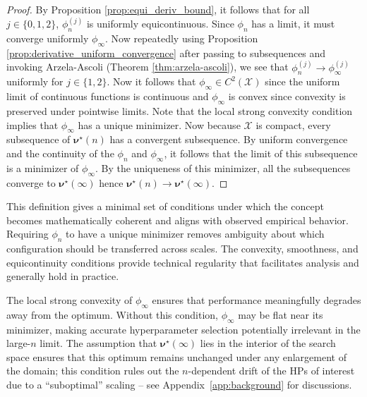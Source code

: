 \documentclass{article} %
\newcommand{\bhp}{\bm{\nu}}                       %
\newcommand{\searchspace}{\mathcal{X}}            %
\begin{document}
\begin{proof}
By Proposition \ref{prop:equi_deriv_bound}, it follows that for all $j \in \{0, 1, 2\}$, ${\phi_n^{(j)}}$ is uniformly equicontinuous. Since $\phi_n$ has a limit, it must converge uniformly $\phi_\infty$. Now repeatedly using Proposition \ref{prop:derivative_uniform_convergence} after passing to subsequences and invoking Arzela-Ascoli (Theorem \ref{thm:arzela-ascoli}), we see that $\phi_n^{(j)} \to \phi_\infty^{(j)}$ uniformly for $j \in \{1, 2\}$. Now it follows that $\phi_\infty \in C^2(\searchspace)$ since the uniform limit of continuous functions is continuous and $\phi_\infty$ is convex since convexity is preserved under pointwise limits. Note that the local strong convexity condition implies that $\phi_\infty$ has a unique minimizer. Now because $\searchspace$ is compact, every subsequence of $\bhp^\star(n)$ has a convergent subsequence. By uniform convergence and the continuity of the $\phi_n$ and $\phi_\infty$, it follows that the limit of this subsequence is a minimizer of $\phi_\infty$. By the uniqueness of this minimizer, all the subsequences converge to $\bhp^\star(\infty)$ hence $\bhp^\star(n) \to \bhp^\star(\infty)$.
\end{proof}

This definition gives a minimal set of conditions under which the concept becomes mathematically coherent and aligns with observed empirical behavior. Requiring $\phi_n$ to have a unique minimizer removes ambiguity about which configuration should be transferred across scales. The convexity, smoothness, and equicontinuity conditions provide technical regularity that facilitates analysis and generally hold in practice.

The local strong convexity of $\phi_\infty$ ensures that performance meaningfully degrades away from the optimum. Without this condition, $\phi_\infty$ may be flat near its minimizer, making accurate hyperparameter selection potentially irrelevant in the large-$n$ limit. The assumption that $\bhp^\star(\infty)$ lies in the interior of the search space ensures that this optimum remains unchanged under any enlargement of the domain; this condition rules out the $n$-dependent drift of the HPs of interest due to a ``suboptimal'' scaling -- see Appendix~\ref{app:background} for discussions. 
\end{document}

